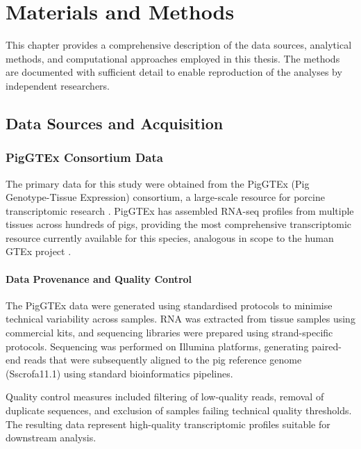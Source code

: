 \chapter{Materials and Methods}\label{chapter:methods}

\clearpage
\FloatBarrier

This chapter provides a comprehensive description of the data sources, analytical methods, and computational approaches employed in this thesis. The methods are documented with sufficient detail to enable reproduction of the analyses by independent researchers.


\section{Data Sources and Acquisition}\label{sec:methods:data}

\subsection{PigGTEx Consortium Data}

The primary data for this study were obtained from the PigGTEx (Pig Genotype-Tissue Expression) consortium, a large-scale resource for porcine transcriptomic research \parencite{teng_compendium_2024, chen_construction_2025, long_comprehensive_2024}. PigGTEx has assembled RNA-seq profiles from multiple tissues across hundreds of pigs, providing the most comprehensive transcriptomic resource currently available for this species, analogous in scope to the human GTEx project \parencite{the_gtex_consortium_gtex_2020}.

\subsubsection{Data Provenance and Quality Control}

The PigGTEx data were generated using standardised protocols to minimise technical variability across samples. RNA was extracted from tissue samples using commercial kits, and sequencing libraries were prepared using strand-specific protocols. Sequencing was performed on Illumina platforms, generating paired-end reads that were subsequently aligned to the pig reference genome (Sscrofa11.1) \parencite{warr_improved_2020} using standard bioinformatics pipelines.

Quality control measures included filtering of low-quality reads, removal of duplicate sequences, and exclusion of samples failing technical quality thresholds. The resulting data represent high-quality transcriptomic profiles suitable for downstream analysis.

